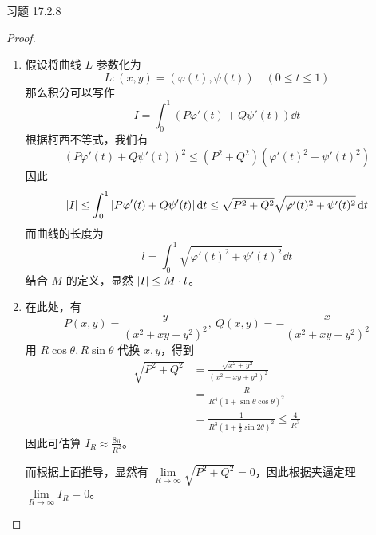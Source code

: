 \begin{problem}
	习题 17.2.8
	\begin{proof}
		\begin{enumerate}
			\item[\textbf{1)}] 假设将曲线 $L$ 参数化为
			$$
			L: (x, y) = (\varphi(t), \psi(t)) \quad (0 \le t \le 1)
			$$
			那么积分可以写作
			$$
			I = \int_{0}^{1} (P \varphi'(t) + Q \psi'(t)) \dd{t}
			$$
			根据柯西不等式，我们有
			$$
			(P \varphi'(t) + Q \psi'(t))^2 \le (P^2 + Q^2) (\varphi'(t)^2 + \psi'(t)^2)
			$$
			因此
			$$
			\abs{I} \le \int_{0}^{1} \abs{P \varphi'(t) + Q \psi'(t)} \dd{t} \le \sqrt{P^2 + Q^2} \sqrt{\varphi'(t)^2 + \psi'(t)^2} \dd{t}
			$$
			而曲线的长度为
			$$
			l = \int_{0}^{1} \sqrt{\varphi'(t)^2 + \psi'(t)^2} \dd{t}
			$$
			结合 $M$ 的定义，显然 $\abs{I} \le M \cdot l$。

			\item[\textbf{2)}] 在此处，有
			$$
			P(x, y) = \frac{y}{(x^2 + xy + y^2)^2},\ Q(x, y) = -\frac{x}{(x^2 + xy + y^2)^2}
			$$
			用 $R \cos \theta, R \sin \theta$ 代换 $x, y$，得到
			$$
			\begin{aligned}
				\sqrt{P^2 + Q^2} & = \frac{\sqrt{x^2 + y^2}}{(x^2 + xy + y^2)^2} \\
				& = \frac{R}{R^4 (1 + \sin \theta \cos \theta)^2} \\
				& = \frac{1}{R^3 (1 + \frac{1}{2} \sin 2\theta)^2} \le \frac{4}{R^3}
			\end{aligned}
			$$
			因此可估算 $I_R \approx \frac{8 \pi}{R^2}$。

			而根据上面推导，显然有 $\lim\limits_{R \to \infty} \sqrt{P^2 + Q^2} = 0$，因此根据夹逼定理 $\lim\limits_{R \to \infty} I_R = 0$。
		\end{enumerate}
	\end{proof}
\end{problem}

